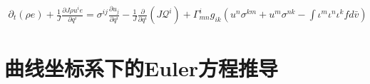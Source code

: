 \documentclass[LBMDerivation.tex]{subfiles}
\begin{document}





\begin{equation}
  \begin{gathered}
    \boxed{
    \partial_{t}\left(\rho e\right) + \frac{1}{J}\frac{\partial J \rho u^i e}{\partial  q^{i}}    =  \sigma^{ij}  \frac{\partial  u_j}{\partial q^{i}} - \frac{1}{J}\frac{\partial}{\partial q^{i}} (J \mathcal{Q}^i) + \Gamma^i_{mn}  g_{ik} ( u^n \sigma^{km}+u^m \sigma^{nk} -  \int \iota^m \iota^n  \iota^{k} f  d \bar{v})
    }
  \end{gathered}
  \label{动量方程输运形式4} ~
\end{equation}






\section{曲线坐标系下的Euler方程推导}
\end{document}
